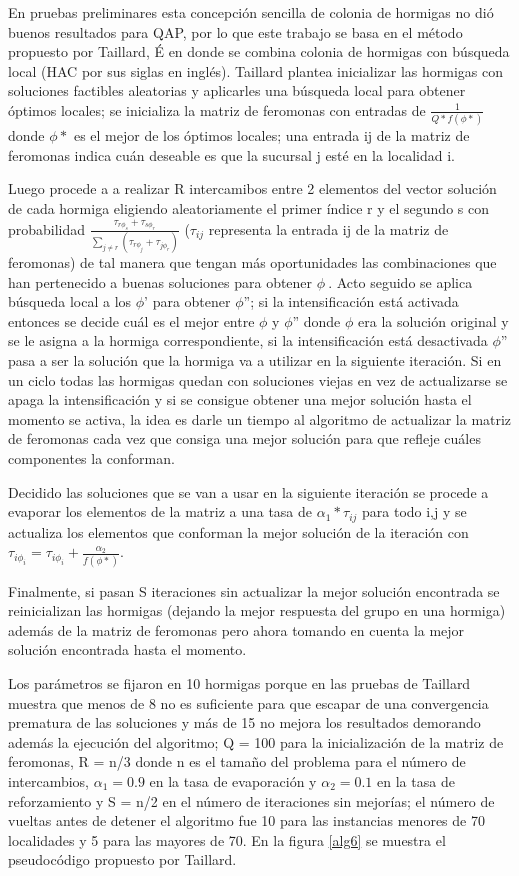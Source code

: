 \documentclass{ci5652}
\begin{document}
En pruebas preliminares esta concepción sencilla de colonia de hormigas no dió buenos resultados para QAP, por lo que este trabajo se basa en el método propuesto por Taillard, É en \cite{15} donde se combina colonia de hormigas con búsqueda local (HAC por sus siglas en inglés). Taillard plantea inicializar las hormigas con soluciones factibles aleatorias y aplicarles una búsqueda local para obtener óptimos locales; se inicializa la matriz de feromonas con entradas de $\frac{1}{Q*f(\phi*)}$ donde $\phi*$ es el mejor de los óptimos locales; una entrada ij de la matriz de feromonas indica cuán deseable es que la sucursal j esté en la localidad i. 

Luego procede a a realizar R intercamibos entre 2 elementos del vector solución de cada hormiga eligiendo aleatoriamente el primer índice r y el segundo s con probabilidad $\frac{\tau_{r\phi_s} + \tau_{s\phi_r}}{\sum_{j \neq r} (\tau_{r\phi_j} + \tau_{j\phi_r})}$ ($\tau_{ij}$ representa la entrada ij de la matriz de feromonas) de tal manera que tengan más oportunidades las combinaciones que han pertenecido a buenas soluciones para obtener $\phi~$. Acto seguido se aplica búsqueda local a los $\phi$' para obtener $\phi$''; si la intensificación está activada entonces se decide cuál es el mejor entre $\phi$ y $\phi$'' donde $\phi$ era la solución original y se le asigna a la hormiga correspondiente, si la intensificación está desactivada $\phi$'' pasa a ser la solución que la hormiga va a utilizar en la siguiente iteración. Si en un ciclo todas las hormigas quedan con soluciones viejas en vez de actualizarse se apaga la intensificación y si se consigue obtener una mejor solución hasta el momento se activa, la idea es darle un tiempo al algoritmo de actualizar la matriz de feromonas cada vez que consiga una mejor solución para que refleje cuáles componentes la conforman.

Decidido las soluciones que se van a usar en la siguiente iteración se procede a evaporar los elementos de la matriz a una tasa de $\alpha_1 * \tau_{ij}$ para todo i,j y se actualiza los elementos que conforman la mejor solución de la iteración con $ \tau_{i\phi_i} = \tau_{i\phi_i} + \frac{\alpha_2}{f(\phi*)}$.

Finalmente, si pasan S iteraciones sin actualizar la mejor solución encontrada se reinicializan las hormigas (dejando la mejor respuesta del grupo en una hormiga) además de la matriz de feromonas pero ahora tomando en cuenta la mejor solución encontrada hasta el momento.

Los parámetros se fijaron en 10 hormigas porque en las pruebas de Taillard muestra que menos de 8 no es suficiente para que escapar de una convergencia prematura de las soluciones y más de 15 no mejora los resultados demorando además la ejecución del algoritmo; Q = 100 para la inicialización de la matriz de feromonas, R = n/3 donde n es el tamaño del problema para el número de intercambios, $\alpha_1 = 0.9$ en la tasa de evaporación y $\alpha_2 = 0.1$ en la tasa de reforzamiento y S = n/2 en el número de iteraciones sin mejorías; el número de vueltas antes de detener el algoritmo fue 10 para las instancias menores de 70 localidades y 5 para las mayores de 70. En la figura \ref{alg6} se muestra el pseudocódigo propuesto por Taillard. 
\end{document}
